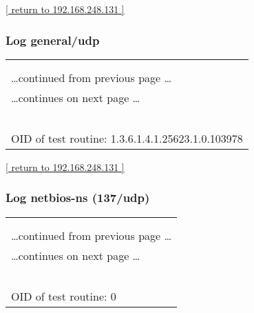 \documentclass{article}
\begin{document}
\begin{footnotesize}\hyperref[host:192.168.248.131]{[ return to 192.168.248.131 ]}\end{footnotesize}
\subsubsection{Log general/udp}
\label{port:192.168.248.131 general/udp Log}

\begin{longtable}{|p{}|}
\hline
\rowcolor{openvas_log}{\color{white}{Log (CVSS: 0.0) }}\\
\rowcolor{openvas_log}{\color{white}{NVT: Checks for open udp ports}}\\
\hline
\endfirsthead
\hfill\ldots continued from previous page \ldots \\
\hline
\endhead
\hline
\ldots continues on next page \ldots \\
\endfoot
\hline
\endlastfoot
\\
\rowcolor{white}{\verb=Open UDP ports: 137=}\\
\rowcolor{white}{\verb==}\\
\rowcolor{white}{\verb==}\\
\\
OID of test routine: 1.3.6.1.4.1.25623.1.0.103978\\
\end{longtable}

\begin{footnotesize}\hyperref[host:192.168.248.131]{[ return to 192.168.248.131 ]}\end{footnotesize}
\subsubsection{Log netbios-ns (137/udp)}
\label{port:192.168.248.131 netbios-ns (137/udp) Log}

\begin{longtable}{|p{}|}
\hline
\rowcolor{openvas_log}{\color{white}{Log}}\\
\rowcolor{openvas_log}{\color{white}{NVT: }}\\
\hline
\endfirsthead
\hfill\ldots continued from previous page \ldots \\
\hline
\endhead
\hline
\ldots continues on next page \ldots \\
\endfoot
\hline
\endlastfoot
\\
\rowcolor{white}{\verb=Open port.=}\\
\rowcolor{white}{\verb==}\\
\rowcolor{white}{\verb==}\\
\\
OID of test routine: 0\\
\end{longtable}
\end{document}
